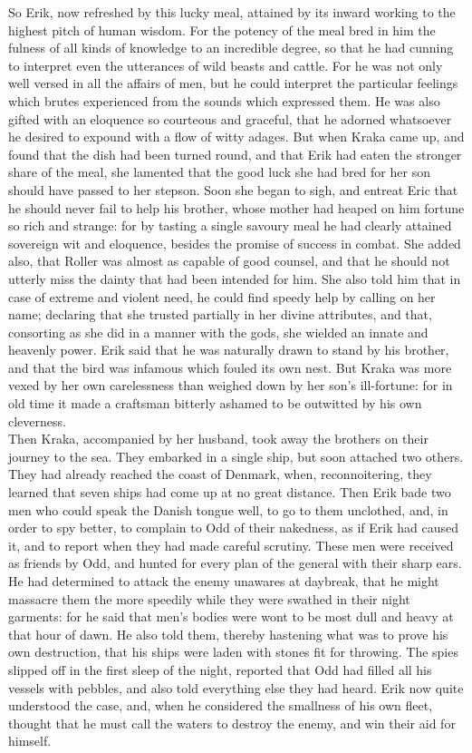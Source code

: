 \documentclass[10pt,a4paper]{report}
\begin{document}
So Erik, now refreshed by this lucky meal, attained by its inward working to the highest pitch of human wisdom. For the potency of the meal bred in him the fulness of all kinds of knowledge to an incredible degree, so that he had cunning to interpret even the utterances of wild beasts and cattle. For he was not only well versed in all the affairs of men, but he could interpret the particular feelings which brutes experienced from the sounds which expressed them. He was also gifted with an eloquence so courteous and graceful, that he adorned whatsoever he desired to expound with a flow of witty adages. But when Kraka came up, and found that the dish had been turned round, and that Erik had eaten the stronger share of the meal, she lamented that the good luck she had bred for her son should have passed to her stepson. Soon she began to sigh, and entreat Eric that he should never fail to help his brother, whose mother had heaped on him fortune so rich and strange: for by tasting a single savoury meal he had clearly attained sovereign wit and eloquence, besides the promise of success in combat. She added also, that Roller was almost as capable of good counsel, and that he should not utterly miss the dainty that had been intended for him. She also told him that in case of extreme and violent need, he could find speedy help by calling on her name; declaring that she trusted partially in her divine attributes, and that, consorting as she did in a manner with the gods, she wielded an innate and heavenly power. Erik said that he was naturally drawn to stand by his brother, and that the bird was infamous which fouled its own nest. But Kraka was more vexed by her own carelessness than weighed down by her son's ill-fortune: for in old time it made a craftsman bitterly ashamed to be outwitted by his own cleverness.\\

Then Kraka, accompanied by her husband, took away the brothers on their journey to the sea. They embarked in a single ship, but soon attached two others. They had already reached the coast of Denmark, when, reconnoitering, they learned that seven ships had come up at no great distance. Then Erik bade two men who could speak the Danish tongue well, to go to them unclothed, and, in order to spy better, to complain to Odd of their nakedness, as if Erik had caused it, and to report when they had made careful scrutiny. These men were received as friends by Odd, and hunted for every plan of the general with their sharp ears. He had determined to attack the enemy unawares at daybreak, that he might massacre them the more speedily while they were swathed in their night garments: for he said that men's bodies were wont to be most dull and heavy at that hour of dawn. He also told them, thereby hastening what was to prove his own destruction, that his ships were laden with stones fit for throwing. The spies slipped off in the first sleep of the night, reported that Odd had filled all his vessels with pebbles, and also told everything else they had heard. Erik now quite understood the case, and, when he considered the smallness of his own fleet, thought that he must call the waters to destroy the enemy, and win their aid for himself.\\
\end{document}
